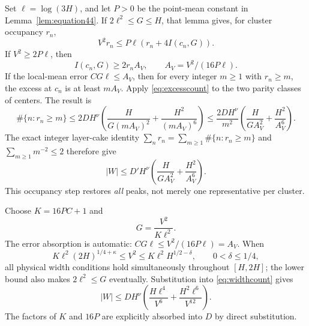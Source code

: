 \documentclass[11pt,a4paper]{article}
\numberwithin{equation}{section}
\theoremstyle{definition}
\begin{document}
Set $\ell=\log(3H)$, and let $P>0$ be the point-mean constant in
Lemma~\ref{lem:equation44}. If $2\ell^2\le G\le H$, that lemma gives, for
cluster occupancy $r_n$,
\[
 V^2r_n\le P\ell(r_n+4I(c_n,G)).
\]
If $V^2\ge2P\ell$, then
\[
 I(c_n,G)\ge2r_n A_V,\qquad A_V=V^2/(16P\ell).
\]
If the local-mean error $CG\ell\le A_V$, then for every integer $m\ge1$
with $r_n\ge m$, the excess at $c_n$ is at least $mA_V$.
Apply \eqref{eq:excesscount} to the two parity classes of centers. The result
is
\[
 \#\{n:r_n\ge m\}\le2D H^\nu
 \left(\frac H{G(mA_V)^2}+\frac{H^2}{(mA_V)^6}\right)
 \le\frac{2D H^\nu}{m^2}
       \left(\frac H{GA_V^2}+\frac{H^2}{A_V^6}\right).
\]
The exact integer layer-cake identity $\sum_nr_n=\sum_{m\ge1}\#\{n:r_n\ge m\}$
and $\sum_{m\ge1}m^{-2}\le2$ therefore give
\begin{equation}\label{eq:widthcount}
 |W|\le D' H^\nu\left(\frac H{GA_V^2}+\frac{H^2}{A_V^6}\right).
\end{equation}
This occupancy step restores \emph{all} peaks, not merely one representative
per cluster.

Choose $K=16PC+1$ and
\[
 G=\frac{V^2}{K\ell^2}.
\]
The error absorption is automatic: $CG\ell\le V^2/(16P\ell)=A_V$.
When
\[
 K\ell^2(2H)^{1/4+\kappa}\le V^2
        \le K\ell^2H^{1/2-\delta},\qquad0<\delta\le1/4,
\]
all physical width conditions hold simultaneously throughout $[H,2H]$;
the lower bound also makes $2\ell^2\le G$ eventually.
Substitution into \eqref{eq:widthcount} gives
\begin{equation}\label{eq:sourcepeakcount}
 |W|\le D H^\nu\left(\frac{H\ell^4}{V^6}
                           +\frac{H^2\ell^6}{V^{12}}\right).
\end{equation}
The factors of $K$ and $16P$ are explicitly absorbed into $D$ by
direct substitution.
\end{document}
